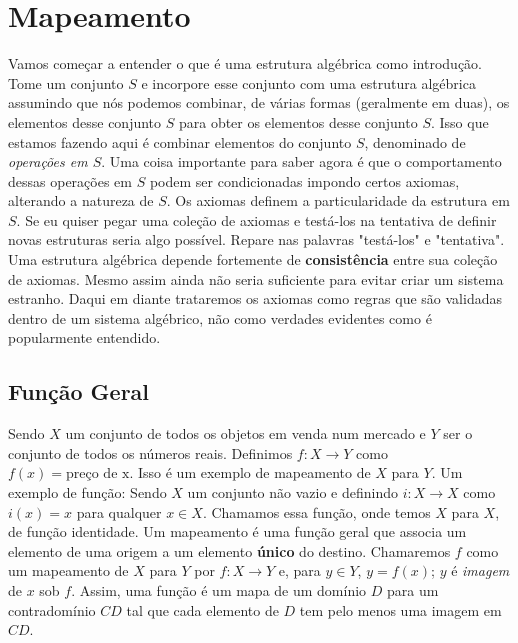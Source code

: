\section{Mapeamento}
   Vamos começar a entender o que é uma estrutura algébrica como introdução. Tome um conjunto $S$ e incorpore esse conjunto com uma estrutura algébrica assumindo que nós podemos combinar, de várias formas (geralmente em duas), os elementos desse conjunto $S$ para obter os elementos desse conjunto $S$. Isso que estamos fazendo aqui é combinar elementos do conjunto $S$, denominado de \textit{operações em $S$}. Uma coisa importante para saber agora é que o comportamento dessas operações em $S$ podem ser condicionadas impondo certos axiomas, alterando a natureza de $S$. Os axiomas definem a particularidade da estrutura em $S$. Se eu quiser pegar uma coleção de axiomas e testá-los na tentativa de definir novas estruturas seria algo possível. Repare nas palavras "testá-los" e "tentativa". Uma estrutura algébrica depende fortemente de \textbf{consistência} entre sua coleção de axiomas. Mesmo assim ainda não seria suficiente para evitar criar um sistema estranho. Daqui em diante trataremos os axiomas como regras que são validadas dentro de um sistema algébrico, não como verdades evidentes como é popularmente entendido.
   \subsection{Função Geral}
      Sendo $X$ um conjunto de todos os objetos em venda num mercado e $Y$ ser o conjunto de todos os números reais. Definimos $f:X \to Y$ como $f(x) = \textrm{preço de x}$. Isso é um exemplo de mapeamento de $X$ para $Y$.
      Um exemplo de função: Sendo $X$ um conjunto não vazio e definindo $i:X \to X$ como $i(x) = x$ para qualquer $x \in X$. Chamamos essa função, onde temos $X$ para $X$, de função identidade.\newline
      Um mapeamento é uma função geral que associa um elemento de uma origem a um elemento \textbf{único} do destino. Chamaremos $f$ como um mapeamento de $X$ para $Y$ por $f:X \to Y$ e, para $y \in Y$, $y = f(x)$; $y$ é \textit{imagem} de $x$ sob $f$.
      Assim, uma função é um mapa de um domínio $D$ para um contradomínio $CD$ tal que cada elemento de $D$ tem pelo menos uma imagem em $CD$.

